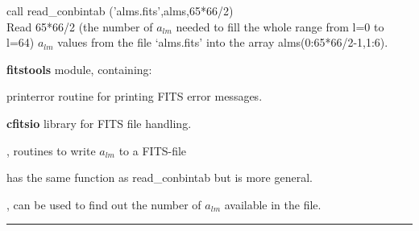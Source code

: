 \begin{example}
{
call read\_conbintab ('alms.fits',alms,65*66/2)  \\
}
{
Read 65*66/2 (the number of $a_{lm}$ needed to fill the whole range from l=0 to l=64)  $a_{lm}$  values from the file `alms.fits' into the array alms(0:65*66/2-1,1:6). 
}
\end{example}

\begin{modules}
  \begin{sulist}{} %
  \item[\textbf{fitstools}] module, containing:
  \item[printerror] routine for printing FITS error messages.
  \item[\textbf{cfitsio}] library for FITS file handling.		
  \end{sulist}
\end{modules}

\begin{related}
  \begin{sulist}{} %
  \item[\htmlref{alms2fits}{sub:alms2fits}, \htmlref{dump\_alms}{sub:dump_alms}] routines to write $a_{lm}$ to a FITS-file 
  \item[\htmlref{fits2alms}{sub:fits2alms}] has the same function as read\_conbintab but is more general.
  \item[\htmlref{number\_of\_alms}{sub:number_of_alms}, \htmlref{getsize\_fits}{sub:getsize_fits}]
  can be used to find out the number of $a_{lm}$ available in the file.
  \end{sulist}
\end{related}

\rule{\hsize}{2mm}

\newpage
